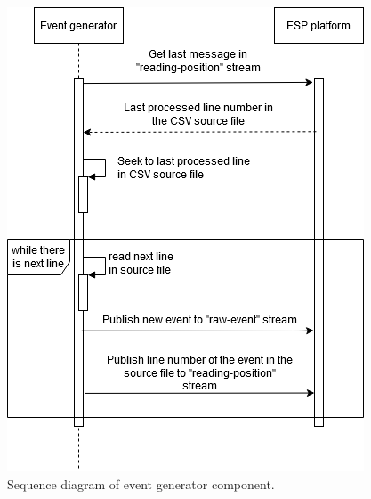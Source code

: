 \begin{figure}[ht!]
	\begin{adjustwidth}{-1cm}{-1cm}
	\centering
	\begin{minipage}[t]{.48\linewidth}
		\centering
		\includegraphics[width=\linewidth]{images/implement-event-generator.png}
		\caption{Sequence diagram of event generator component.}
		\label{fig:implementeventgenerator1}
	\end{minipage}%
	\hfill
	\begin{minipage}[t]{.48\linewidth}
		\centering

\end{minipage}
\end{adjustwidth}
\end{figure}

